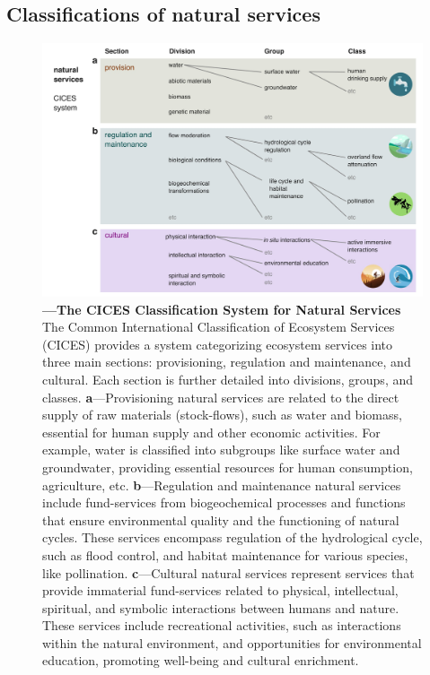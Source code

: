 \documentclass[./main_en.tex]{subfiles}
\begin{document}
\subsection{Classifications of natural services} \label{sec:natserv:sist}

\begin{figure}[t!] 
\centering				
\includegraphics[width=0.98\linewidth]{figs/fig_cices_en.jpg}		
\caption[The CICES Classification System for Natural Services]
{\textbf{---\;The CICES Classification System for Natural Services}
    The Common International Classification of Ecosystem Services (CICES) provides a system categorizing ecosystem services into three main sections: provisioning, regulation and maintenance, and cultural. Each section is further detailed into divisions, groups, and classes.
    \;\textbf{a}\;---\;Provisioning natural services are related to the direct supply of raw materials (stock-flows), such as water and biomass, essential for human supply and other economic activities. For example, water is classified into subgroups like surface water and groundwater, providing essential resources for human consumption, agriculture, etc.
    \;\textbf{b}\;---\;Regulation and maintenance natural services include fund-services from biogeochemical processes and functions that ensure environmental quality and the functioning of natural cycles. These services encompass regulation of the hydrological cycle, such as flood control, and habitat maintenance for various species, like pollination.
    \;\textbf{c}\;---\;Cultural natural services represent services that provide immaterial fund-services related to physical, intellectual, spiritual, and symbolic interactions between humans and nature. These services include recreational activities, such as interactions within the natural environment, and opportunities for environmental education, promoting well-being and cultural enrichment.
}
\label{fig:eco:natserv:cices} 		
\end{figure}
\end{document}
